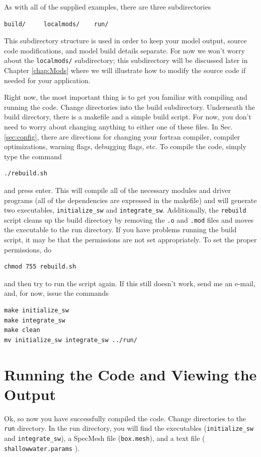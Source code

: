 \documentclass{softwaremanual}
\begin{document}
As with all of the supplied examples, there are three subdirectories
\begin{center}
\begin{verbatim}
build/     localmods/    run/
\end{verbatim}
\end{center}
This subdirectory structure is used in order to keep your model output, source code modifications, and model build details separate. For now we won't worry about the \texttt{localmods/} subdirectory; this subdirectory will be discussed later in Chapter \ref{chap:Mods} where we will illustrate how to modify the source code if needed for your application.

Right now, the most important thing is to get you familiar with compiling and running the code. Change directories into the build subdirectory. Underneath the build directory, there is a makefile and a simple build script. For now, you don't need to worry about changing anything to either one of these files. In Sec. \ref{sec:config}, there are directions for changing your fortran compiler, compiler optimizations, warning flags, debugging flags, etc. To compile the code, simply type the command
\begin{verbatim}
./rebuild.sh
\end{verbatim}
and press enter. This will compile all of the necessary modules and  driver programs (all of the dependencies are expressed in the makefile) and will generate two executables, \texttt{initialize\_sw} and \texttt{integrate\_sw}. Additionally, the \texttt{rebuild} script cleans up the build directory by removing the \texttt{.o} and \texttt{.mod} files and moves the executable to the run directory. If you have problems running the build script, it may be that the permissions are not set appropriately. To set the proper permissions, do
\begin{verbatim}
chmod 755 rebuild.sh
\end{verbatim}
and then try to run the script again. If this still doesn't work, send me an e-mail, and, for now, issue the commands
\begin{verbatim}
make initialize_sw
make integrate_sw
make clean
mv initialize_sw integrate_sw ../run/
\end{verbatim}

\section{Running the Code and Viewing the Output}
Ok, so now you have successfully compiled the code. Change directories to the \texttt{run} directory. In the run directory, you will find the executables (\texttt{initialize\_sw} and \texttt{integrate\_sw}), a SpecMesh file (\texttt{box.mesh}), and a text file ( \texttt{shallowwater.params} ).
\end{document}
